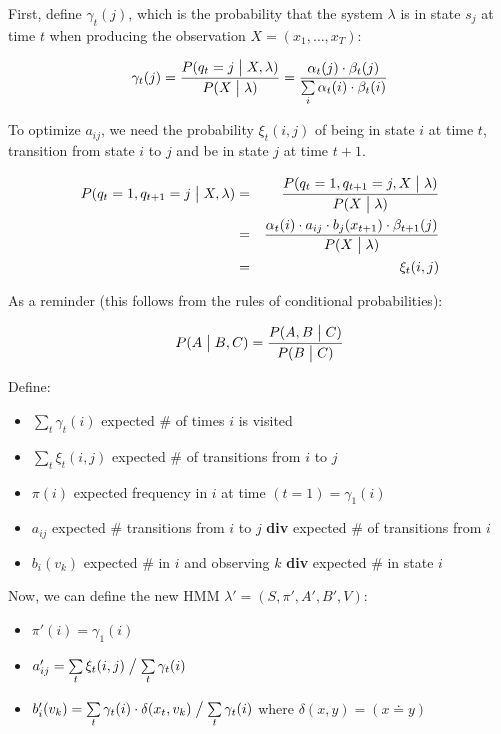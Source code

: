 \documentclass[11pt]{article}
\begin{document}
First, define $\gamma_t(j)$, which is the probability that the system $\lambda$ is in state $s_j$ at time $t$ when producing the observation $X = (x_1, \ldots, x_T)$:

\begin{equation}
    \gamma_t(j) = \frac{P(q_t = j \bigm| X, \lambda)}{P(X \bigm| \lambda)} = \frac{\alpha_t(j) \cdot \beta_t(j)}{\sum\limits_i \alpha_t(i) \cdot \beta_t(i)}
\end{equation}

To optimize $a_{ij}$, we need the probability $\xi_t(i, j)$ of being in state $i$ at time $t$, transition from state $i$ to $j$ and be in state $j$ at time $t+1$.

\begin{eqnarray*}
    P(q_t = 1, q_{t+1} = j \bigm| X, \lambda) &=& \frac{P(q_t = 1, q_{t+1} = j, X \bigm| \lambda)}{P(X \bigm| \lambda)} \\
                                              &=& \frac{\alpha_t(i) \cdot a_{ij} \cdot b_j(x_{t+1}) \cdot \beta_{t+1}(j)}{P(X \bigm| \lambda)} \\
                                              &=& \xi_t(i, j)
\end{eqnarray*}

As a reminder (this follows from the rules of conditional probabilities):

\begin{equation}
    P(A \bigm| B, C) = \frac{P(A, B \bigm| C)}{P(B \bigm| C)}
\end{equation}

Define:
\begin{itemize}
    \item $\sum\limits_t \gamma_t(i)$ expected \# of times $i$ is visited
    \item $\sum\limits_t \xi_t(i, j)$ expected \# of transitions from $i$ to $j$
    \item $\pi(i)$ expected frequency in $i$ at time $(t = 1) = \gamma_1(i)$
    \item $a_{ij}$ expected \# transitions from $i$ to $j$ \textbf{div} expected \# of transitions from $i$
    \item $b_i(v_k)$ expected \# in $i$ and observing $k$ \textbf{div} expected \# in state $i$
\end{itemize}

Now, we can define the new HMM $\lambda' = (S, \pi', A', B', V)$:
\begin{itemize}
    \item $\pi'(i) = \gamma_1(i)$
    \item $a'_{ij} = \sum\limits_t \xi_t(i, j) \bigm/ \sum\limits_t \gamma_t(i)$
    \item $b'_i(v_k) = \sum\limits_t \gamma_t(i) \cdot \delta(x_t, v_k) \bigm/ \sum\limits_t \gamma_t(i)$ where $\delta(x, y) = (x \doteq y)$
\end{itemize}
\end{document}
